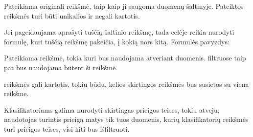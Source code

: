 \documentclass[letterpaper,10pt,lithuanian]{sphinxmanual}
\begin{document}
\begin{fulllineitems}
\label{\detokenize{dimensijos:enum.source}}
\pysigstartsignatures
\pysigline
{}
\pysigstopsignatures
\sphinxAtStartPar
Pateikiama originali reikšmė, taip kaip ji saugoma duomenų šaltinyje.
Pateiktos reikšmės turi būti unikalios ir negali kartotis.

\sphinxAtStartPar
Jei pageidaujama aprašyti tuščią šaltinio reikšmę, tada
{\hyperref[\detokenize{dimensijos:property.prepare}]{}} celėje reikia nurodyti formulę, kuri tuščią
reikšmę pakeičia, į kokią nors kitą. Formulės pavyzdys:

\begin{sphinxVerbatim}[commandchars=\\\{\}]
 
\end{sphinxVerbatim}

\end{fulllineitems}


\begin{fulllineitems}
\label{\detokenize{dimensijos:enum.prepare}}
\pysigstartsignatures
\pysigline
{}
\pysigstopsignatures
\sphinxAtStartPar
Pateikiama reikšmė, tokia kuri bus naudojama atveriant duomenis.
{\hyperref[\detokenize{dimensijos:model.prepare}]{}} filtruose taip pat bus naudojama būtent ši
reikšmė.

\sphinxAtStartPar
{} reikšmės gali kartotis, tokiu būdu, kelios skirtingos
 reikšmės bus susietos su viena  reikšme.

\end{fulllineitems}


\begin{fulllineitems}
\label{\detokenize{dimensijos:enum.access}}
\pysigstartsignatures
\pysigline
{}
\pysigstopsignatures
\sphinxAtStartPar
Klasifikatoriams galima nurodyti skirtingas prieigos teises, tokiu
atveju, naudotojas turintis  prieigą matys tik tuos duomenis,
kurių klasifikatorių reikšmės turi  prieigos teises, visi kiti bus
išfiltruoti.

\end{fulllineitems}
\end{document}
